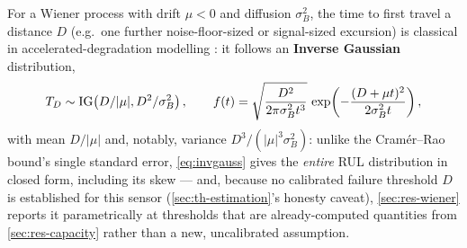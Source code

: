 For a Wiener process with drift $\mu<0$ and diffusion $\sigma_B^2$, the time
to first travel a distance $D$ (e.g.\ one further noise-floor-sized or
signal-sized excursion) is classical in accelerated-degradation modelling
\cite{whitmore1997,si2011}: it follows an \textbf{Inverse Gaussian}
distribution,
\begin{equation}
  T_D \sim \mathrm{IG}\!\left(D/|\mu|,D^2/\sigma_B^2\right), \qquad
  f(t) = \sqrt{\frac{D^2}{2\pi\sigma_B^2 t^3}}\,
         \exp\!\left(-\frac{(D+\mu t)^2}{2\sigma_B^2 t}\right),
  \label{eq:invgauss}
\end{equation}
with mean $D/|\mu|$ and, notably, variance $D^3/(|\mu|^3\sigma_B^2)$: unlike
the Cram\'er--Rao bound's single standard error, \cref{eq:invgauss} gives the
\emph{entire} RUL distribution in closed form, including its skew --- and,
because no calibrated failure threshold $D$ is established for this sensor
(\cref{sec:th-estimation}'s honesty caveat), \cref{sec:res-wiener} reports it
parametrically at thresholds that are already-computed quantities from
\cref{sec:res-capacity} rather than a new, uncalibrated assumption.
